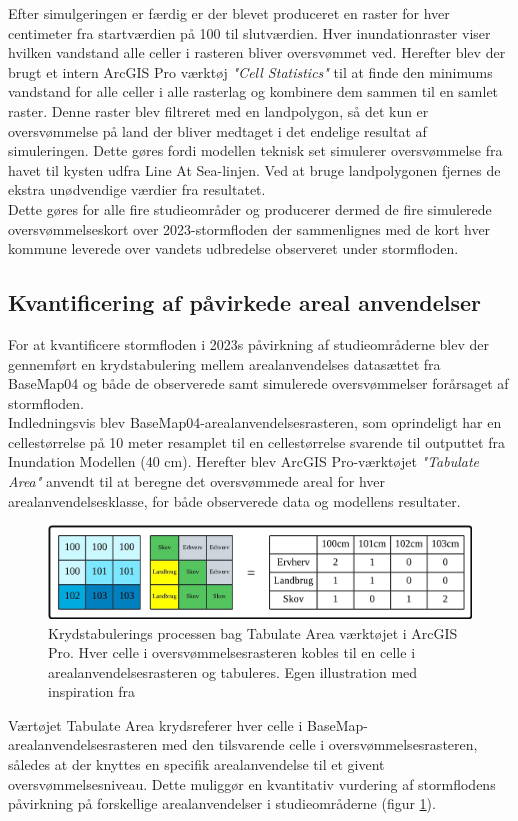 Efter simulgeringen er færdig er der blevet produceret en raster for hver centimeter fra startværdien på 100 til slutværdien. Hver inundationraster viser hvilken vandstand alle celler i rasteren bliver oversvømmet ved. Herefter blev der brugt et intern ArcGIS Pro værktøj \textit{"Cell Statistics"} til at finde den minimums vandstand for alle celler i alle rasterlag og kombinere dem sammen til en samlet raster. Denne raster blev filtreret med en landpolygon, så det kun er oversvømmelse på land der bliver medtaget i det endelige resultat af simuleringen. Dette gøres fordi modellen teknisk set simulerer oversvømmelse fra havet til kysten udfra Line At Sea-linjen. Ved at bruge landpolygonen fjernes de ekstra unødvendige værdier fra resultatet.\\
Dette gøres for alle fire studieområder og producerer dermed de fire simulerede oversvømmelseskort over 2023-stormfloden der sammenlignes med de kort hver kommune leverede over vandets udbredelse observeret under stormfloden.  


\subsection{Kvantificering af påvirkede areal anvendelser} \label{Afsnit: Udregning af påvirkede areal anvendelser}

For at kvantificere stormfloden i 2023s påvirkning af studieområderne blev der gennemført en krydstabulering mellem arealanvendelses datasættet fra BaseMap04 og både de observerede samt simulerede oversvømmelser forårsaget af stormfloden.\\

Indledningsvis blev BaseMap04-arealanvendelsesrasteren, som oprindeligt har en cellestørrelse på 10 meter resamplet til en cellestørrelse svarende til outputtet fra Inundation Modellen (40 cm). Herefter blev ArcGIS Pro-værktøjet \textit{"Tabulate Area"} anvendt til at beregne det oversvømmede areal for hver arealanvendelsesklasse, for både observerede data og modellens resultater.
 
\begin{figure}[H]
    \centering
    \includegraphics[width=1\linewidth]{images/metode/tabulate.jpg}
    \caption{Krydstabulerings processen bag Tabulate Area værktøjet i ArcGIS Pro. Hver celle i oversvømmelsesrasteren kobles til en celle i arealanvendelsesrasteren og tabuleres. Egen illustration med inspiration fra \cite{esri_tabulate_nodate}}
    \label{Figur: Tabulate}
\end{figure}
Værtøjet Tabulate Area krydsreferer hver celle i BaseMap-arealanvendelsesrasteren med den tilsvarende celle i oversvømmelsesrasteren, således at der knyttes en specifik arealanvendelse til et givent oversvømmelsesniveau. Dette muliggør en kvantitativ vurdering af stormflodens påvirkning på forskellige arealanvendelser i studieområderne (figur \ref{Figur: Tabulate}).\\

